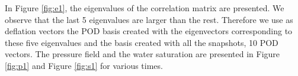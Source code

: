 \documentclass[12pt]{article}
\begin{document}

In Figure \ref{fig:e1}, the eigenvalues of the correlation matrix are presented. We observe that the last 5 eigenvalues are larger than the rest. Therefore we use as deflation vectors the POD basis created with the eigenvectors corresponding to these five eigenvalues and the basis created with all the snapshots, 10 POD vectors.
The pressure field and the water saturation are presented in Figure \ref{fig:p1} and Figure \ref{fig:s1} for various times.
\end{document}
